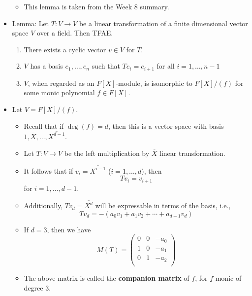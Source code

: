 \documentclass[../notes.tex]{subfiles}
\begin{document}
\begin{itemize}
    \begin{itemize}
        \item This lemma is taken from the Week 8 summary.
    \end{itemize}
    \item Lemma: Let $T:V\to V$ be a linear transformation of a finite dimensional vector space $V$ over a field. Then TFAE.
    \begin{enumerate}[label={(\roman*)}]
        \item There exists a cyclic vector $v\in V$ for $T$.
        \item $V$ has a basis $e_1,\dots,e_n$ such that $Te_i=e_{i+1}$ for all $i=1,\dots,n-1$
        \item $V$, when regarded as an $F[X]$-module, is isomorphic to $F[X]/(f)$ for some monic polynomial $f\in F[X]$.
    \end{enumerate}
    \item Let $V=F[X]/(f)$.
    \begin{itemize}
        \item Recall that if $\deg(f)=d$, then this is a vector space with basis $1,\overline{X},\dots,\overline{X^{d-1}}$.
        \item Let $T:V\to V$ be the left multiplication by $\overline{X}$ linear transformation.
        \item It follows that if $v_i=\overline{X^{i-1}}$ ($i=1,\dots,d$), then
        \begin{equation*}
            Tv_i = v_{i+1}
        \end{equation*}
        for $i=1,\dots,d-1$.
        \item Additionally, $Tv_d=\overline{X^d}$ will be expressable in terms of the basis, i.e.,
        \begin{equation*}
            Tv_d = -(a_0v_1+a_1v_2+\cdots+a_{d-1}v_d)
        \end{equation*}
        \item If $d=3$, then we have
        \begin{equation*}
            M(T) =
            \begin{pmatrix}
                0 & 0 & -a_0\\
                1 & 0 & -a_1\\
                0 & 1 & -a_2\\
            \end{pmatrix}
        \end{equation*}
        \item The above matrix is called the \textbf{companion matrix} of $f$, for $f$ monic of degree 3.

\end{itemize}
\end{itemize}
\end{document}
